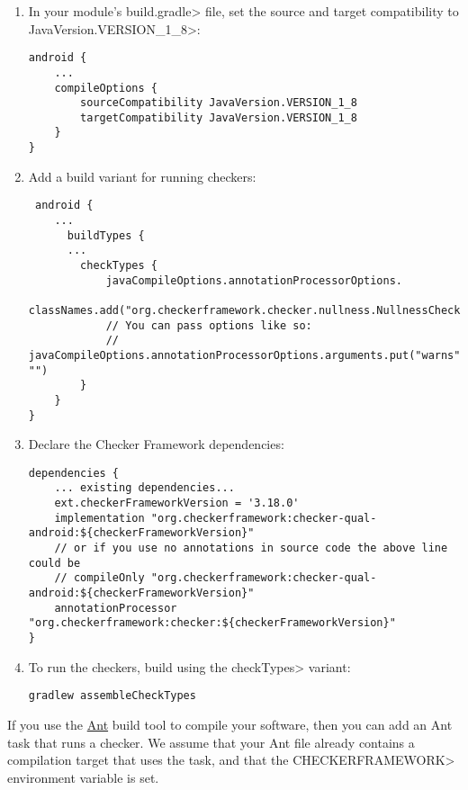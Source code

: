 \begin{enumerate}

\item In your module's \<build.gradle> file, set the source and target
  compatibility to \<JavaVersion.VERSION\_1\_8>:

\begin{Verbatim}
android {
    ...
    compileOptions {
        sourceCompatibility JavaVersion.VERSION_1_8
        targetCompatibility JavaVersion.VERSION_1_8
    }
}
\end{Verbatim}

\item Add a build variant for running checkers:

 \begin{Verbatim}
 android {
    ...
      buildTypes {
      ...
        checkTypes {
            javaCompileOptions.annotationProcessorOptions.
                    classNames.add("org.checkerframework.checker.nullness.NullnessChecker")
            // You can pass options like so:
            // javaCompileOptions.annotationProcessorOptions.arguments.put("warns", "")
        }
    }
}
\end{Verbatim}

\item Declare the Checker Framework dependencies:

\begin{mysmall}
\begin{Verbatim}
dependencies {
    ... existing dependencies...
    ext.checkerFrameworkVersion = '3.18.0'
    implementation "org.checkerframework:checker-qual-android:${checkerFrameworkVersion}"
    // or if you use no annotations in source code the above line could be
    // compileOnly "org.checkerframework:checker-qual-android:${checkerFrameworkVersion}"
    annotationProcessor "org.checkerframework:checker:${checkerFrameworkVersion}"
}
\end{Verbatim}
\end{mysmall}

\item To run the checkers, build using the \<checkTypes> variant:
\begin{Verbatim}
gradlew assembleCheckTypes
\end{Verbatim}

\end{enumerate}



If you use the \href{http://ant.apache.org/}{Ant} build tool to compile
your software, then you can add an Ant task that runs a checker.  We assume
that your Ant file already contains a compilation target that uses the
 task, and that the \<CHECKERFRAMEWORK> environment variable is set.


